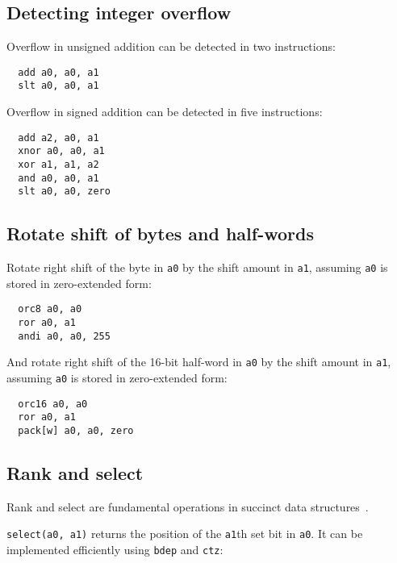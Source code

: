 
\subsection{Detecting integer overflow}

Overflow in unsigned addition can be detected in two instructions:

\begin{verbatim}
  add a0, a0, a1
  slt a0, a0, a1
\end{verbatim}

Overflow in signed addition can be detected in five instructions:

\begin{verbatim}
  add a2, a0, a1
  xnor a0, a0, a1
  xor a1, a1, a2
  and a0, a0, a1
  slt a0, a0, zero
\end{verbatim}


\subsection{Rotate shift of bytes and half-words}

Rotate right shift of the byte in {\tt a0} by the shift amount in {\tt a1},
assuming {\tt a0} is stored in zero-extended form:

\begin{verbatim}
  orc8 a0, a0
  ror a0, a1
  andi a0, a0, 255
\end{verbatim}

And rotate right shift of the 16-bit half-word in {\tt a0} by the shift amount in {\tt a1},
assuming {\tt a0} is stored in zero-extended form:

\begin{verbatim}
  orc16 a0, a0
  ror a0, a1
  pack[w] a0, a0, zero
\end{verbatim}


\subsection{Rank and select}

Rank and select are fundamental operations in succinct data structures~\cite{SelectX86}.

\texttt{select(a0, a1)} returns the position of the \texttt{a1}th set bit in \texttt{a0}.
It can be implemented efficiently using \texttt{bdep} and \texttt{ctz}:

